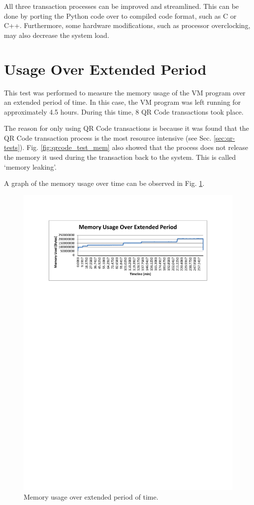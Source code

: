All three transaction processes can be improved and streamlined. This can be done by
porting the Python code over to compiled code format, such as C or C++. Furthermore,  some
hardware modifications, such as processor overclocking, may also decrease the system load.

\section{Usage Over Extended Period}
\label{sec:memory_leak}

This test was performed to measure the memory usage of the VM program over an extended
period of time. In this case, the VM program was left running for approximately 4.5 hours.
During this time, 8 QR Code transactions took place. 

The reason for only using QR Code transactions is because it was found that the QR
Code transaction process is the most resource intensive (see Sec. \ref{sec:qr-tests}).
Fig. \ref{fig:qrcode_test_mem} also showed that the process does not release the memory it
used during the transaction back to the system. This is called `memory leaking'.

A graph of the memory usage over time can be observed in Fig. \ref{fig:long-test}.

\begin{figure}
 \centering 
 \includegraphics[clip=true, trim = 50 590 0 70,
 scale=0.9]{extended_test}
 \caption{Memory usage over extended period of time.}
 \label{fig:long-test}
\end{figure}

